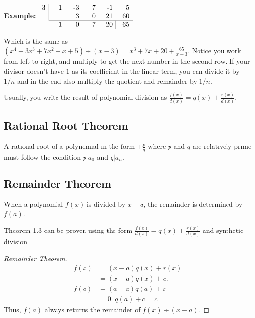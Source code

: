 \textbf{Example:}
$\begin{array}{c|rrrrr} 3&\parbox[b]{0.2in}{\raggedleft 1}&\parbox[b]{0.2in}{\raggedleft -3}&\parbox[b]{0.2in}{\raggedleft 7}&\parbox[b]{0.2in}{\raggedleft -1}&\parbox[b]{0.2in}{\raggedleft 5}\\ &&{3}&{0}&21&60 \\\cline{2-6} \multicolumn{2}{r}{{1}}& {0}&7&20&\multicolumn{1}{|r}{65} \end{array}$

Which is the same as $(x^4 - 3x^3 + 7x^2 - x + 5) \div (x - 3) = x^3+7x+20+\frac{65}{x-3}$. Notice you work from left to right, and multiply to get the next number in the second row.
If your divisor doesn't have $1$ as its coefficient in the linear term, you can divide it by $1/n$ and in the end also multiply the quotient and remainder by $1/n$.

Usually, you write the result of polynomial division as $\frac{f(x)}{d(x)}=q(x)+\frac{r(x)}{d(x)}$.

\subsection{Rational Root Theorem}
\begin{theorem}
  A rational root of a polynomial in the form $\pm\frac{p}{q}$ where $p$ and $q$ are relatively prime must follow the condition
  $p | a_0$ and $q | a_n$.
\end{theorem}

\subsection{Remainder Theorem}
\begin{theorem}
  When a polynomial $f(x)$ is divided by $x-a$, the remainder is determined by $f(a)$.
\end{theorem}

Theorem 1.3 can be proven using the form $\frac{f(x)}{d(x)}=q(x)+\frac{r(x)}{d(x)}$ and synthetic division.

\begin{proof}[Remainder Theorem]
  \begin{align*}
    f(x) &= (x-a)q(x) + r(x) \\
    &= (x-a)q(x)+c. \\
    f(a)&=(a-a)q(a)+c \\
    &=0 \cdot q(a) + c = c
  \end{align*}
  Thus, $f(a)$ always returns the remainder of $f(x) \div (x-a)$.
\end{proof}

